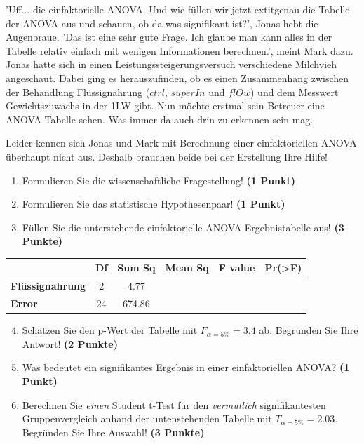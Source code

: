 \documentclass[a4paper, 9pt]{scrartcl}\usepackage[]{graphicx}\usepackage[]{xcolor}
\begin{document}
'Uff... die einfaktorielle ANOVA. Und wie füllen wir jetzt 	extit{genau} die Tabelle der ANOVA aus und schauen, ob da was signifikant ist?', Jonas hebt die Augenbraue. 'Das ist eine sehr gute Frage. Ich glaube man kann alles in der Tabelle relativ einfach mit wenigen Informationen berechnen.', meint Mark dazu. Jonas hatte sich in einen Leistungssteigerungsversuch verschiedene Milchvieh angeschaut. Dabei ging es herauszufinden, ob es einen Zusammenhang zwischen der Behandlung Flüssignahrung ($ctrl$, $superIn$ und $flOw$) und dem Messwert Gewichtszuwachs in der 1LW gibt. Nun möchte erstmal sein Betreuer eine ANOVA Tabelle sehen. Was immer da auch drin zu erkennen sein mag.



\vspace{1ex}

Leider kennen sich Jonas und Mark mit Berechnung einer einfaktoriellen ANOVA überhaupt nicht aus. Deshalb brauchen beide bei der Erstellung Ihre Hilfe! 

\begin{enumerate}
  \item Formulieren Sie die wissenschaftliche Fragestellung! \textbf{(1 Punkt)}
  \item Formulieren Sie das statistische Hypothesenpaar! \textbf{(1 Punkt)}
\item Füllen Sie die unterstehende einfaktorielle ANOVA Ergebnistabelle aus! \textbf{(3 Punkte)}
\end{enumerate}

\vspace{1Ex}

\begin{center}
  \Large
  \begin{tabular}{lccccp{3cm}}
\toprule
     & \textbf{Df} & \textbf{Sum Sq} & \textbf{Mean Sq} & \textbf{F value} & \textbf{Pr(>F)} \strut\\
    \midrule
   \textbf{Flüssignahrung}  & 2 & 4.77 &  &  &  \strut\\
   \textbf{Error}  & 24 & 674.86 &  &  &  \strut\\
\bottomrule
  \end{tabular}
\end{center}

\vspace{1Ex}

\begin{enumerate}
  \setcounter{enumi}{3}
\item Schätzen Sie den p-Wert der Tabelle mit $F_{\alpha = 5\%} = 3.4$ ab. Begründen Sie Ihre Antwort! \textbf{(2 Punkte)}
\item Was bedeutet ein signifikantes Ergebnis in einer einfaktoriellen ANOVA? \textbf{(1 Punkt)}
\item Berechnen Sie \textit{einen} Student t-Test für den \textit{vermutlich} signifikantesten Gruppenvergleich anhand der untenstehenden Tabelle mit $T_{\alpha = 5\%} = 2.03$. Begründen Sie Ihre Auswahl! \textbf{(3 Punkte)}
\end{enumerate}
\end{document}
